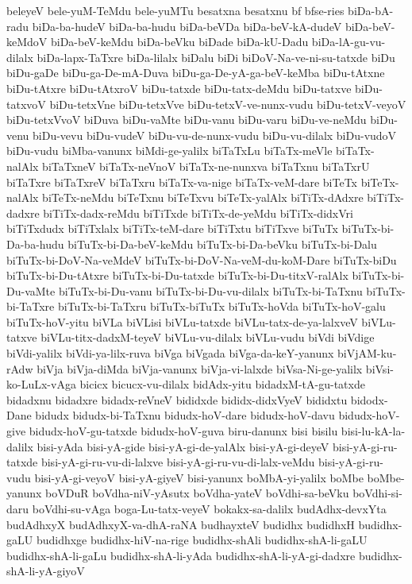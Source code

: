 {beleyeV
bele-yuM-TeMdu
bele-yuMTu
besatxna
besatxnu
bf
bfse-ries
biDa-bA-radu
biDa-ba-hudeV
biDa-ba-hudu
biDa-beVDa
biDa-beV-kA-dudeV
biDa-beV-keMdoV
biDa-beV-keMdu
biDa-beVku
biDade
biDa-kU-Dadu
biDa-lA-gu-vu-dilalx
biDa-lapx-TaTxre
biDa-lilalx
biDalu
biDi
biDoV-Na-ve-ni-su-tatxde
biDu
biDu-gaDe
biDu-ga-De-mA-Duva
biDu-ga-De-yA-ga-beV-keMba
biDu-tAtxne
biDu-tAtxre
biDu-tAtxroV
biDu-tatxde
biDu-tatx-deMdu
biDu-tatxve
biDu-tatxvoV
biDu-tetxVne
biDu-tetxVve
biDu-tetxV-ve-nunx-vudu
biDu-tetxV-veyoV
biDu-tetxVvoV
biDuva
biDu-vaMte
biDu-vanu
biDu-varu
biDu-ve-neMdu
biDu-venu
biDu-vevu
biDu-vudeV
biDu-vu-de-nunx-vudu
biDu-vu-dilalx
biDu-vudoV
biDu-vudu
biMba-vanunx
biMdi-ge-yalilx
biTaTxLu
biTaTx-meVle
biTaTx-nalAlx
biTaTxneV
biTaTx-neVnoV
biTaTx-ne-nunxva
biTaTxnu
biTaTxrU
biTaTxre
biTaTxreV
biTaTxru
biTaTx-va-nige
biTaTx-veM-dare
biTeTx
biTeTx-nalAlx
biTeTx-neMdu
biTeTxnu
biTeTxvu
biTeTx-yalAlx
biTiTx-dAdxre
biTiTx-dadxre
biTiTx-dadx-reMdu
biTiTxde
biTiTx-de-yeMdu
biTiTx-didxVri
biTiTxdudx
biTiTxlalx
biTiTx-teM-dare
biTiTxtu
biTiTxve
biTuTx
biTuTx-bi-Da-ba-hudu
biTuTx-bi-Da-beV-keMdu
biTuTx-bi-Da-beVku
biTuTx-bi-Dalu
biTuTx-bi-DoV-Na-veMdeV
biTuTx-bi-DoV-Na-veM-du-koM-Dare
biTuTx-biDu
biTuTx-bi-Du-tAtxre
biTuTx-bi-Du-tatxde
biTuTx-bi-Du-titxV-ralAlx
biTuTx-bi-Du-vaMte
biTuTx-bi-Du-vanu
biTuTx-bi-Du-vu-dilalx
biTuTx-bi-TaTxnu
biTuTx-bi-TaTxre
biTuTx-bi-TaTxru
biTuTx-biTuTx
biTuTx-hoVda
biTuTx-hoV-galu
biTuTx-hoV-yitu
biVLa
biVLisi
biVLu-tatxde
biVLu-tatx-de-ya-lalxveV
biVLu-tatxve
biVLu-titx-dadxM-teyeV
biVLu-vu-dilalx
biVLu-vudu
biVdi
biVdige
biVdi-yalilx
biVdi-ya-lilx-ruva
biVga
biVgada
biVga-da-keY-yanunx
biVjAM-ku-rAdw
biVja
biVja-diMda
biVja-vanunx
biVja-vi-lalxde
biVsa-Ni-ge-yalilx
biVsi-ko-LuLx-vAga
bicicx
bicucx-vu-dilalx
bidAdx-yitu
bidadxM-tA-gu-tatxde
bidadxnu
bidadxre
bidadx-reVneV
bididxde
bididx-didxVyeV
bididxtu
bidodx-Dane
bidudx
bidudx-bi-TaTxnu
bidudx-hoV-dare
bidudx-hoV-davu
bidudx-hoV-give
bidudx-hoV-gu-tatxde
bidudx-hoV-guva
biru-danunx
bisi
bisilu
bisi-lu-kA-la-dalilx
bisi-yAda
bisi-yA-gide
bisi-yA-gi-de-yalAlx
bisi-yA-gi-deyeV
bisi-yA-gi-ru-tatxde
bisi-yA-gi-ru-vu-di-lalxve
bisi-yA-gi-ru-vu-di-lalx-veMdu
bisi-yA-gi-ru-vudu
bisi-yA-gi-veyoV
bisi-yA-giyeV
bisi-yanunx
boMbA-yi-yalilx
boMbe
boMbe-yanunx
boVDuR
boVdha-niV-yAsutx
boVdha-yateV
boVdhi-sa-beVku
boVdhi-si-daru
boVdhi-su-vAga
boga-Lu-tatx-veyeV
bokakx-sa-dalilx
budAdhx-devxYta
budAdhxyX
budAdhxyX-va-dhA-raNA
budhayxteV
budidhx
budidhxH
budidhx-gaLU
budidhxge
budidhx-hiV-na-rige
budidhx-shAli
budidhx-shA-li-gaLU
budidhx-shA-li-gaLu
budidhx-shA-li-yAda
budidhx-shA-li-yA-gi-dadxre
budidhx-shA-li-yA-giyoV
}
